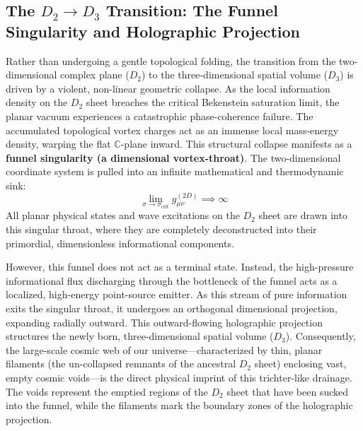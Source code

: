 \documentclass[11pt,a4paper]{article}
\theoremstyle{plain}
\theoremstyle{definition}
\theoremstyle{remark}
\begin{document}
\subsection{The $D_2 \to D_3$ Transition: The Funnel Singularity and Holographic Projection}
Rather than undergoing a gentle topological folding, the transition from the two-dimensional complex plane ($D_2$) to the three-dimensional spatial volume ($D_3$) is driven by a violent, non-linear geometric collapse. As the local information density on the $D_2$ sheet breaches the critical Bekenstein saturation limit, the planar vacuum experiences a catastrophic phase-coherence failure. The accumulated topological vortex charges act as an immense local mass-energy density, warping the flat $\mathbb{C}$-plane inward. This structural collapse manifests as a \textbf{funnel singularity (a dimensional vortex-throat)}. The two-dimensional coordinate system is pulled into an infinite mathematical and thermodynamic sink:
\begin{equation}
\lim_{\sigma \to \sigma_{\text{crit}}} g_{\mu\nu}^{(2D)} \implies \infty
\end{equation}
All planar physical states and wave excitations on the $D_2$ sheet are drawn into this singular throat, where they are completely deconstructed into their primordial, dimensionless informational components.

However, this funnel does not act as a terminal state. Instead, the high-pressure informational flux discharging through the bottleneck of the funnel acts as a localized, high-energy point-source emitter. As this stream of pure information exits the singular throat, it undergoes an orthogonal dimensional projection, expanding radially outward. This outward-flowing holographic projection structures the newly born, three-dimensional spatial volume ($D_3$). Consequently, the large-scale cosmic web of our universe—characterized by thin, planar filaments (the un-collapsed remnants of the ancestral $D_2$ sheet) enclosing vast, empty cosmic voids—is the direct physical imprint of this trichter-like drainage. The voids represent the emptied regions of the $D_2$ sheet that have been sucked into the funnel, while the filaments mark the boundary zones of the holographic projection.
\end{document}
